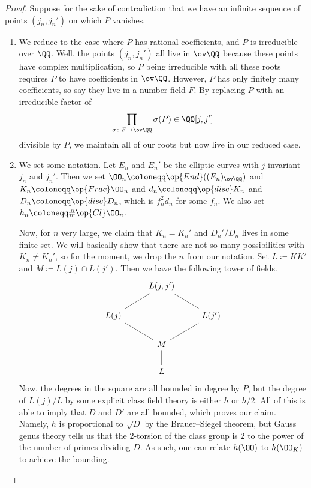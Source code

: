 \documentclass[../notes.tex]{subfiles}
\begin{document}
\begin{proof}
	Suppose for the sake of contradiction that we have an infinite sequence of points $(j_n,j_n')$ on which $P$ vanishes.
	\begin{enumerate}
		\item We reduce to the case where $P$ has rational coefficients, and $P$ is irreducible over $\QQ$. Well, the points $(j_n,j_n')$ all live in $\ov\QQ$ because these points have complex multiplication, so $P$ being irreducible with all these roots requires $P$ to have coefficients in $\ov\QQ$. However, $P$ has only finitely many coefficients, so say they live in a number field $F$. By replacing $P$ with an irreducible factor of
		\[\prod_{\sigma\colon F\to\ov\QQ}\sigma(P)\in\QQ[j,j']\]
		divisible by $P$, we maintain all of our roots but now live in our reduced case.

		\item We set some notation. Let $E_n$ and $E_n'$ be the elliptic curves with $j$-invariant $j_n$ and $j_n'$. Then we set $\OO_n\coloneqq\op{End}((E_n)_{\ov\QQ})$ and $K_n\coloneqq\op{Frac}\OO_n$ and $d_n\coloneqq\op{disc}K_n$ and $D_n\coloneqq\op{disc}D_n$, which is $f_n^2d_n$ for some $f_n$. We also set $h_n\coloneqq\#\op{Cl}\OO_n$.

		Now, for $n$ very large, we claim that $K_n=K_n'$ and $D_n'/D_n$ lives in some finite set. We will basically show that there are not so many possibilities with $K_n\ne K_n'$, so for the moment, we drop the $n$ from our notation. Set $L\coloneqq KK'$ and $M\coloneqq L(j)\cap L(j')$. Then we have the following tower of fields.
		\[\begin{tikzcd}
			& {L(j,j')} \\
			{L(j)} && {L(j')} \\
			& M \\
			& L
			\arrow[no head, from=2-1, to=1-2]
			\arrow[no head, from=2-3, to=1-2]
			\arrow[no head, from=3-2, to=2-1]
			\arrow[no head, from=3-2, to=2-3]
			\arrow[no head, from=4-2, to=3-2]
		\end{tikzcd}\]
		Now, the degrees in the square are all bounded in degree by $P$, but the degree of $L(j)/L$ by some explicit class field theory is either $h$ or $h/2$. All of this is able to imply that $D$ and $D'$ are all bounded, which proves our claim. Namely, $h$ is proportional to $\sqrt D$ by the Brauer--Siegel theorem, but Gauss genus theory tells us that the $2$-torsion of the class group is $2$ to the power of the number of primes dividing $D$. As such, one can relate $h(\OO)$ to $h(\OO_K)$ to achieve the bounding.


\end{enumerate}
\end{proof}
\end{document}
